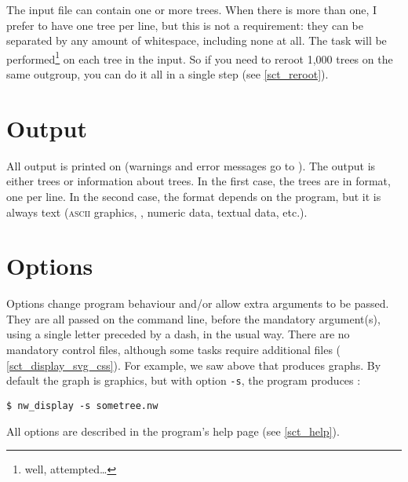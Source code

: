 The input file can contain one or more trees. When there is more than one, I
prefer to have one tree per line, but this is not a requirement: they can be
separated by any amount of whitespace, including none at all. The task will be
performed\footnote{well, attempted\ldots} on each tree in the input. So if you
need to reroot 1,000 trees on the same outgroup, you can do it all in a single
step (see \ref{sct_reroot}). 

\section{Output}
\label{sct_output}

All output is printed on \stdout{} (warnings and error messages go to \stderr).
The output is either trees or information about trees. In the first case,
the trees are in \nw{} format, one per line. In the second case, the format
depends on the program, but it is always text (\textsc{ascii} graphics, \svg,
numeric data, textual data, etc.).

\section{Options}
\label{sct_options}

Options change program behaviour and/or allow extra arguments to be passed.
They are all passed on the command line, before the mandatory argument(s),
using a single letter preceded by a dash, in the usual \unix{} way. There are
no mandatory control files, although some tasks require additional files (\eg{}
\ref{sct_display_svg_css}). For example, we saw above that \display{} produces
graphs. By default the graph is \ascii{} graphics, but with option \texttt{-s},
the program produces \svg:
\begin{verbatim}
$ nw_display -s sometree.nw
\end{verbatim}
All options are described in the program's help page (see \ref{sct_help}).
